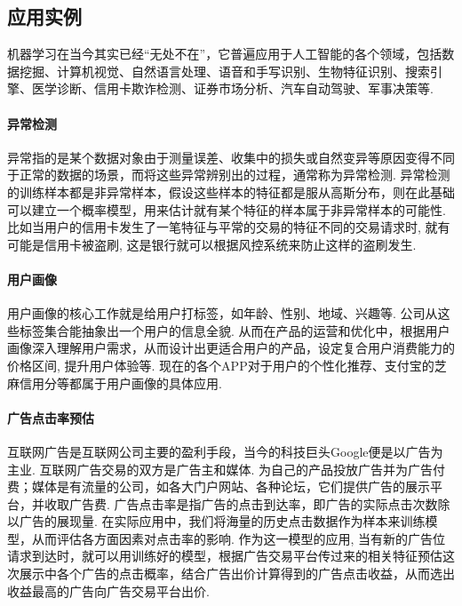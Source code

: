 \documentclass[lang=cn,11pt,a4paper]{elegantpaper}
\begin{document}
\subsection{应用实例}
\par 机器学习在当今其实已经“无处不在”，它普遍应用于人工智能的各个领域，包括数据挖掘、计算机视觉、自然语言处理、语音和手写识别、生物特征识别、搜索引擎、医学诊断、信用卡欺诈检测、证券市场分析、汽车自动驾驶、军事决策等.
\paragraph{异常检测}异常指的是某个数据对象由于测量误差、收集中的损失或自然变异等原因变得不同于正常的数据的场景，而将这些异常辨别出的过程，通常称为异常检测. 异常检测的训练样本都是非异常样本，假设这些样本的特征都是服从高斯分布，则在此基础可以建立一个概率模型，用来估计就有某个特征的样本属于非异常样本的可能性. 比如当用户的信用卡发生了一笔特征与平常的交易的特征不同的交易请求时, 就有可能是信用卡被盗刷, 这是银行就可以根据风控系统来防止这样的盗刷发生.
\paragraph{用户画像}用户画像的核心工作就是给用户打标签，如年龄、性别、地域、兴趣等. 公司从这些标签集合能抽象出一个用户的信息全貌. 从而在产品的运营和优化中，根据用户画像深入理解用户需求，从而设计出更适合用户的产品，设定复合用户消费能力的价格区间, 提升用户体验等. 现在的各个APP对于用户的个性化推荐、支付宝的芝麻信用分等都属于用户画像的具体应用.
\paragraph{广告点击率预估}互联网广告是互联网公司主要的盈利手段，当今的科技巨头Google便是以广告为主业. 互联网广告交易的双方是广告主和媒体. 为自己的产品投放广告并为广告付费；媒体是有流量的公司，如各大门户网站、各种论坛，它们提供广告的展示平台，并收取广告费. 广告点击率是指广告的点击到达率，即广告的实际点击次数除以广告的展现量. 在实际应用中，我们将海量的历史点击数据作为样本来训练模型，从而评估各方面因素对点击率的影响. 作为这一模型的应用, 当有新的广告位请求到达时，就可以用训练好的模型，根据广告交易平台传过来的相关特征预估这次展示中各个广告的点击概率，结合广告出价计算得到的广告点击收益，从而选出收益最高的广告向广告交易平台出价. 
\end{document}
